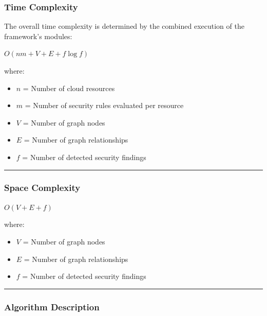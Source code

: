 \subsubsection{Time Complexity}

The overall time complexity is determined by the combined execution of the framework's modules:

$O(nm + V + E + f \log f)$

where:

\begin{itemize}
\tightlist
\item
$n$ = Number of cloud resources\\
\item
$m$ = Number of security rules evaluated per resource\\
\item
$V$ = Number of graph nodes\\
\item
$E$ = Number of graph relationships\\
\item
$f$ = Number of detected security findings
\end{itemize}

\begin{center}\rule{0.5\linewidth}{0.5pt}\end{center}

\subsubsection{Space Complexity}

$O(V + E + f)$

where:

\begin{itemize}
\tightlist
\item
$V$ = Number of graph nodes\\
\item
$E$ = Number of graph relationships\\
\item
$f$ = Number of detected security findings
\end{itemize}

\begin{center}\rule{0.5\linewidth}{0.5pt}\end{center}

\subsubsection{Algorithm Description}

